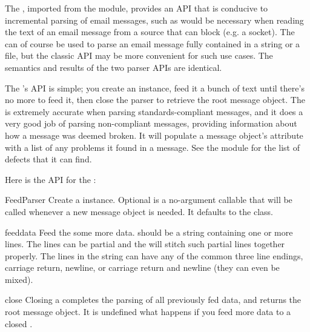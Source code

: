 
The , imported from the  module,
provides an API that is conducive to incremental parsing of email messages,
such as would be necessary when reading the text of an email message from a
source that can block (e.g. a socket).  The
 can of course be used to parse an email message fully
contained in a string or a file, but the classic  API may be
more convenient for such use cases.  The semantics and results of the two
parser APIs are identical.

The 's API is simple; you create an instance, feed it a
bunch of text until there's no more to feed it, then close the parser to
retrieve the root message object.  The  is extremely
accurate when parsing standards-compliant messages, and it does a very good
job of parsing non-compliant messages, providing information about how a
message was deemed broken.  It will populate a message object's 
attribute with a list of any problems it found in a message.  See the
 module for the list of defects that it can find.

Here is the API for the :

\begin{classdesc}{FeedParser}{}
Create a  instance.  Optional  is a
no-argument callable that will be called whenever a new message object is
needed.  It defaults to the  class.
\end{classdesc}

\begin{methoddesc}[FeedParser]{feed}{data}
Feed the  some more data.   should be a
string containing one or more lines.  The lines can be partial and the
 will stitch such partial lines together properly.  The
lines in the string can have any of the common three line endings, carriage
return, newline, or carriage return and newline (they can even be mixed).
\end{methoddesc}

\begin{methoddesc}[FeedParser]{close}{}
Closing a  completes the parsing of all previously fed data,
and returns the root message object.  It is undefined what happens if you feed
more data to a closed .
\end{methoddesc}

